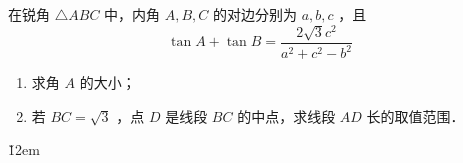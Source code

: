 \begin{example}
    在锐角 $\triangle A B C$ 中，内角 $A, B, C$ 的对边分别为 $a, b, c$ ，且
    $$
        \tan A+\tan B=\frac{2 \sqrt{3} c^2}{a^2+c^2-b^2}
    $$
    \begin{enumerate}
        \item 求角 $A$ 的大小；
        \item 若 $B C=\sqrt{3}$ ，点 $D$ 是线段 $B C$ 的中点，求线段 $A D$ 长的取值范围．
    \end{enumerate}
\end{example}
\v{12em}

